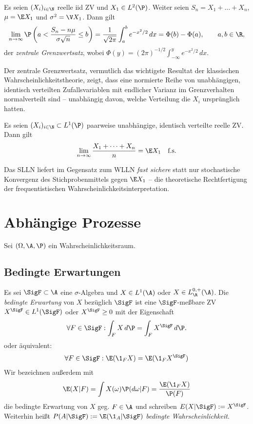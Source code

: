 \documentclass[11pt, a4paper]{article}
\begin{document}
\begin{theorem}\Theorem
    Es seien $(X_i)_{i \in \N}$ reelle iid ZV und $X_1 \in L^2(\P)$. Weiter seien $S_n = X_1 + \dots + X_n$, $\mu = \E X_1$ und $\sigma^2 = \V X_1$. Dann gilt
    $$\lim_{n \to \infty} \P\left(a < \frac{S_n - n\mu}{\sigma\sqrt{n}} \le b\right) = \frac{1}{\sqrt{2\pi}} \int_a^b e^{-x^2/2} \, dx = \Phi(b) - \Phi(a), \qquad a, b \in \R,$$
    der \emph{zentrale Grenzwertsatz},
    wobei $\Phi(y) = (2\pi)^{-1/2} \displaystyle\int_{-\infty}^y e^{-x^2/2} \, dx$.
\end{theorem}

\begin{note}
    Der zentrale Grenzwertsatz, vermutlich das wichtigste Resultat der klassischen Wahrscheinlichkeitstheorie, zeigt, dass eine normierte Reihe von unabhängigen, identisch verteilten Zufallsvariablen mit endlicher Varianz im Grenzverhalten normalverteilt sind -- unabhängig davon, welche Verteilung die $X_i$ ursprünglich hatten.
\end{note}

\begin{theorem} \Theorem
    Es seien $(X_i)_{i \in \N} \subset L^1(\P)$ paarweise unabhängige, identisch verteilte reelle ZV. Dann gilt
    $$\lim_{n \to \infty} \frac{X_1 + \dots + X_n}{n} = \E X_1 \quad \text{f.s.}$$
\end{theorem}

\begin{note}
    Das SLLN liefert im Gegensatz zum WLLN \emph{fast sichere} statt nur stochastische Konvergenz des Stichprobenmittels gegen $\E X_1$ -- die theoretische Rechtfertigung der frequentistischen Wahrscheinlichkeitsinterpretation.
\end{note}

\section{Abhängige Prozesse}
Sei $(\Omega, \A, \P)$ ein Wahrscheinlichkeitsraum.
\subsection{Bedingte Erwartungen}
\begin{definition} \Theorem
    Es sei $\SigF \subset \A$ eine $\sigma$-Algebra und $X \in L^1(\A)$ oder $X \in L^{0,+}_{\R}(\A)$. Die \emph{bedingte Erwartung} von $X$ bezüglich $\SigF$ ist eine $\SigF$-meßbare ZV $X^{\SigF} \in L^1(\SigF)$ oder $X^{\SigF} \ge 0$ mit der Eigenschaft
    $$\forall F \in \SigF: \int_F X \, d\P = \int_F X^{\SigF} \, d\P.$$ oder äquivalent:
    $$\forall F\in \SigF :  \E(\1_F X) =\E(\1_F X^\SigF ) $$
    Wir bezeichnen außerdem mit  
    $$\E(X|F)= \int X(\omega)\P(d\omega| F) = \frac{\E(\1_F X)}{\P(F)}$$
    die bedingte Erwartung von $X$ geg. $F\in \A$ und schreiben 
    $E(X|\SigF) := X^\SigF$. Weiterhin heißt $P(A|\SigF) := \E(\1_A | \SigF)$ \emph{bedingte Wahrscheinlichkeit}.
    \end{definition}
\end{document}
